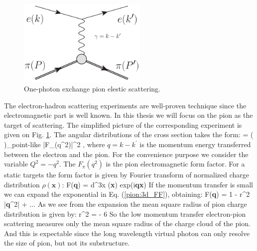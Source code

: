 \begin{figure}[!h]
\begin{center}
\includegraphics[width=0.55\textwidth]{figures/FF_gen} 
\caption{\footnotesize One-photon exchange pion elestic scattering. }\label{fig:FF_gen}
\end{center}
\end{figure}

The electron-hadron scattering experiments are well-proven technique since the electromagnetic part is well known. In this thesis we will focus on the pion as the target of scattering. The simplified picture of the corresponding experiment is given on Fig. \ref{fig:FF_gen}. The angular distributions of the cross section takes the form:
\beqa
	 =  \left(  \right)_{point-like} |F_\pi(q^2)|^2 \;,
	\label{pion:crosssection}
\eeqa
where $q=k-k^{\prime}$ is the momentum energy transferred between the electron and the pion. For the convenience purpose we consider the variable $Q^2 = - q^2$. The $F_\pi(q^2)$ is the pion electromagnetic form factor. For a static targets the form factor is given by Fourier transform of normalized charge distribution $\rho(\textbf{x})$:
\beqa
	F(\textbf{q}) = \int d^3x \rho(\textbf{x}) exp(i\textbf{q}\textbf{x})
	\label{pion:3d_FF}
\eeqa
If the momentum transfer is small we can expand the exponential in Eq. (\ref{pion:3d_FF}), obtaining:
\beqa
	F(\textbf{q}) = 1 - \langle r^2 \rangle|\textbf{q}^2| + ...
\eeqa
As we see from the expansion the mean square radius of pion charge distribution is given by:
\beqa
\langle r^2 \rangle = - 6 
\eeqa
So the low momentum transfer electron-pion scattering measures only the mean square radius of the charge cloud of the pion. And this is expectable since the long wavelength virtual photon can only resolve the size of pion, but not its substructure. \\

